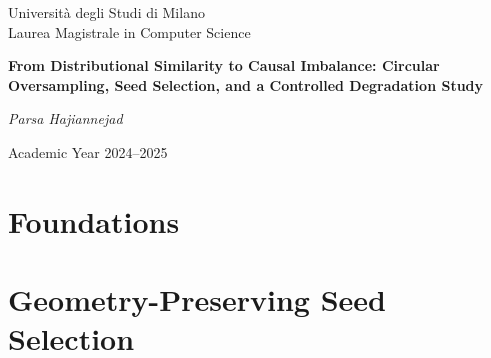\documentclass[12pt, a4paper, twoside, openright]{book}
\theoremstyle{plain}
\theoremstyle{definition}
\newcommand{\thesistitle}{%
  From Distributional Similarity to Causal Imbalance:
  Circular Oversampling, Seed Selection, and a Controlled Degradation Study}
\newcommand{\authorname}{Parsa Hajiannejad}
\begin{document}
\frontmatter
{}

\begin{titlepage}
\centering
\vspace*{2cm}
{\Large Università degli Studi di Milano\\
Laurea Magistrale in Computer Science\par}
\vspace{3cm}
{\huge\bfseries \thesistitle\par}
\vspace{2cm}
{\Large\itshape \authorname\par}
\vfill
{\large Academic Year 2024--2025\par}
\end{titlepage}
\cleardoublepage


\cleardoublepage

\tableofcontents
\cleardoublepage

\listoffigures
\cleardoublepage

\listoftables
\cleardoublepage

\mainmatter
{}

\part{Foundations}
\label{part:foundations}







\part{Geometry-Preserving Seed Selection}
\label{part:seed_selection}
\end{document}
